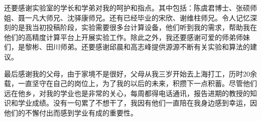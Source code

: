 
还要感谢实验室的学长和学弟对我的呵护和指点。其中包括：陈虞君博士、张硕师姐、聂一凡大师兄、沈驿康师兄。还有已经毕业的宋欣、谢维柱师兄。令人记忆深刻的是我当初投稿阶段，实验需要很多台计算设备，他们听到我的需求，帮助我在他们的高精度计算平台上开展实验工作。除此之外，我还要感谢可爱的师弟师妹们，是黎彬、田川师弟。还要感谢邱晨和高志峰提供源源不断有关实验和算法的建议。

最后感谢我的父母，由于家境不是很好，父母从我三岁开始去上海打工，历时20余载，一直坚守在自己的岗位上，为了我的以后的未来，积攒下一点积蓄。尽管他们远在他乡，对我的学业也是非常的关心，每周都得电话通讯，报告进期的教授的知识和学业成绩。没有一句累了不想干了，我因有他们一直陪在我身边感到幸运，因他们的不懈付出而感到学业有成的重要性。